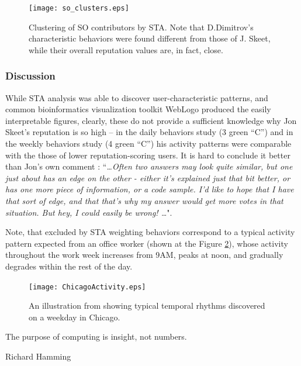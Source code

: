 \begin{figure}[t]
   \centering
   \texttt{[image: so\_clusters.eps]}
   \caption{Clustering of SO contributors by STA. Note that D.Dimitrov's characteristic behaviors were found different from those of J. Skeet, while their overall reputation values are, in fact, close.}
   \label{fig:stack_clusters}   
\end{figure}

\subsubsection{Discussion}
While STA analysis was able to discover user-characteristic patterns, and common bioinformatics visualization toolkit WebLogo produced the easily interpretable figures, clearly, these do not provide a sufficient knowledge why Jon Skeet's reputation is so high -- in the daily behaviors study (3 green ``C'') and in the weekly behaviors study (4 green ``C'') his activity patterns were comparable with the those of lower reputation-scoring users. It is hard to conclude it better than Jon's own comment \cite{skeet}: ``\textit{\dots Often two answers may look quite similar, but one just about has an edge on the other - either it's explained just that bit better, or has one more piece of information, or a code sample. I'd like to hope that I have that sort of edge, and that that's why my answer would get more votes in that situation. But hey, I could easily be wrong! \dots}".

Note, that excluded by STA weighting behaviors correspond to a typical activity pattern expected from an office worker (shown at the Figure \ref{fig:chicago_activity}), whose activity throughout the work week increases from 9AM, peaks at noon, and gradually degrades within the rest of the day.

\begin{figure}[t]
   \centering
   \texttt{[image: ChicagoActivity.eps]}
   \caption{An illustration from \cite{activity_patterns} showing typical temporal rhythms discovered on a weekday in Chicago.}
   \label{fig:chicago_activity}   
\end{figure}

\epigraph{The purpose of computing is insight, not numbers.}{Richard Hamming}
